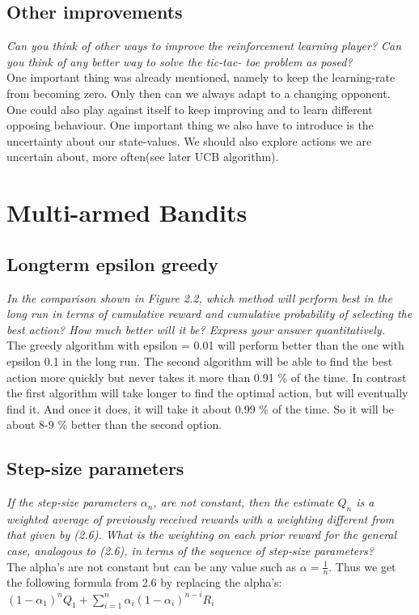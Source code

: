 \documentclass[12pt,a4paper]{article}
\begin{document}
\subsection{Other improvements}
\textit{Can you think of other ways to improve the reinforcement learning player? Can you think of any better way to solve the tic-tac- toe problem as posed?} \\

One important thing was already mentioned, namely to keep the learning-rate from becoming zero. Only then can we always adapt to a changing opponent. One could also play against itself to keep improving and to learn different opposing behaviour. One important thing we also have to introduce is the uncertainty about our state-values. We should also explore actions we are uncertain about, more often(see later UCB algorithm).

\section{Multi-armed Bandits} 
\subsection{Longterm epsilon greedy}
\textit{In the comparison shown in Figure 2.2, which method will perform best in the long run in terms of cumulative reward and cumulative probability of selecting the best action? How much better will it be? Express your answer quantitatively.} \\

The greedy algorithm with epsilon = 0.01 will perform better than the one with epsilon 0.1 in the long run. The second algorithm will be able to find the best action more quickly but never takes it more than 0.91 \% of the time. In contrast the first algorithm will take longer to find the optimal action, but will eventually find it. And once it does, it will take it about 0.99 \% of the time. So it will be about 8-9 \% better than the second option. 

\subsection{Step-size parameters}
\textit{If the step-size parameters $\alpha_n$, are not constant, then the estimate $Q_n$ is a weighted average of previously received rewards with a weighting different from that given by (2.6). What is the weighting on each prior reward for the general case, analogous to (2.6), in terms of the sequence of step-size parameters?} \\ 
The alpha's are not constant but can be any value such as $ \alpha = \frac{1}{n}$. Thus we get the following formula from 2.6 by replacing the alpha's: \\
$ (1-\alpha_1)^nQ_1 + \sum_{i=1}^{n} \alpha_i(1-\alpha_i)^{n-i}R_i $
\end{document}

